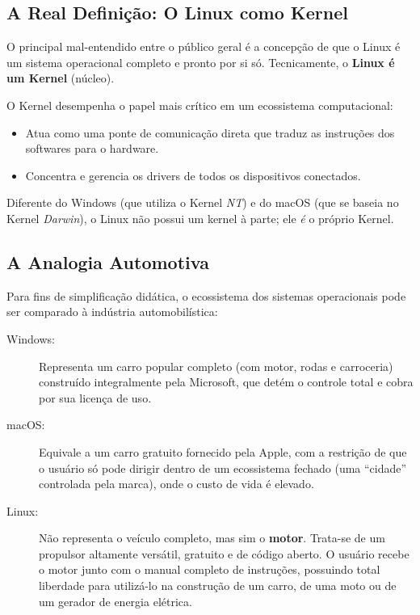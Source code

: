 \documentclass{article}
\begin{document}
\subsection{A Real Definição: O Linux como Kernel}
O principal mal-entendido entre o público geral é a concepção de que o Linux é um sistema operacional completo e pronto por si só. Tecnicamente, o \textbf{Linux é um Kernel} (núcleo).

O Kernel desempenha o papel mais crítico em um ecossistema computacional:
\begin{itemize}
    \item Atua como uma ponte de comunicação direta que traduz as instruções dos softwares para o hardware.
    \item Concentra e gerencia os drivers de todos os dispositivos conectados.
\end{itemize}
Diferente do Windows (que utiliza o Kernel \textit{NT}) e do macOS (que se baseia no Kernel \textit{Darwin}), o Linux não possui um kernel à parte; ele \textit{é} o próprio Kernel.

\subsection{A Analogia Automotiva}
Para fins de simplificação didática, o ecossistema dos sistemas operacionais pode ser comparado à indústria automobilística:
\begin{description}
    \item[Windows:] Representa um carro popular completo (com motor, rodas e carroceria) construído integralmente pela Microsoft, que detém o controle total e cobra por sua licença de uso.
    \item[macOS:] Equivale a um carro gratuito fornecido pela Apple, com a restrição de que o usuário só pode dirigir dentro de um ecossistema fechado (uma ``cidade'' controlada pela marca), onde o custo de vida é elevado.
    \item[Linux:] Não representa o veículo completo, mas sim o \textbf{motor}. Trata-se de um propulsor altamente versátil, gratuito e de código aberto. O usuário recebe o motor junto com o manual completo de instruções, possuindo total liberdade para utilizá-lo na construção de um carro, de uma moto ou de um gerador de energia elétrica.
\end{description}
\end{document}
